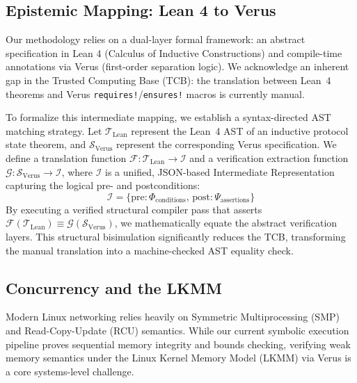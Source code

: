 \documentclass[10pt,journal,compsoc]{IEEEtran}
\begin{document}
\subsection{Epistemic Mapping: Lean 4 to Verus}
Our methodology relies on a dual-layer formal framework: an abstract specification in Lean 4 (Calculus of Inductive Constructions) and compile-time annotations via Verus (first-order separation logic). We acknowledge an inherent gap in the Trusted Computing Base (TCB): the translation between Lean~4 theorems and Verus \texttt{requires!}/\texttt{ensures!} macros is currently manual. 

To formalize this intermediate mapping, we establish a syntax-directed AST matching strategy. Let $\mathcal{T}_{\text{Lean}}$ represent the Lean~4 AST of an inductive protocol state theorem, and $\mathcal{S}_{\text{Verus}}$ represent the corresponding Verus specification. We define a translation function $\mathcal{F}: \mathcal{T}_{\text{Lean}} \to \mathcal{I}$ and a verification extraction function $\mathcal{G}: \mathcal{S}_{\text{Verus}} \to \mathcal{I}$, where $\mathcal{I}$ is a unified, JSON-based Intermediate Representation capturing the logical pre- and postconditions:
\begin{equation}
\mathcal{I} = \{ \text{pre}: \Phi_{\text{conditions}}, \, \text{post}: \Psi_{\text{assertions}} \}
\end{equation}
By executing a verified structural compiler pass that asserts $\mathcal{F}(\mathcal{T}_{\text{Lean}}) \equiv \mathcal{G}(\mathcal{S}_{\text{Verus}})$, we mathematically equate the abstract verification layers. This structural bisimulation significantly reduces the TCB, transforming the manual translation into a machine-checked AST equality check.

\subsection{Concurrency and the LKMM}
Modern Linux networking relies heavily on Symmetric Multiprocessing (SMP) and Read-Copy-Update (RCU) semantics. While our current symbolic execution pipeline proves sequential memory integrity and bounds checking, verifying weak memory semantics under the Linux Kernel Memory Model (LKMM) via Verus is a core systems-level challenge. 
\end{document}
